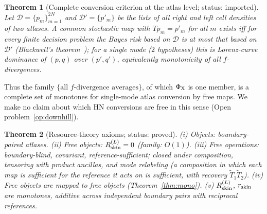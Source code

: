 \documentclass[11pt]{article}
\newtheorem{theorem}{Theorem}
\newcommand{\Rskin}{R_{\rm skin}}
\newcommand{\rskin}{r_{\rm skin}}
\newcommand{\PhiX}{\Phi_{\rm X}}
\begin{document}
\begin{theorem}[Complete conversion criterion at the atlas level; status: imported]\label{thm:blackwell}
Let $\mathcal D=\{p_m\}_{m=1}^{2N}$ and $\mathcal D'=\{p'_m\}$ be the lists of all right and left cell densities of two atlases. A common stochastic map with $Tp_m=p'_m$ for all $m$ exists iff for every finite decision problem the Bayes risk based on $\mathcal D$ is at most that based on $\mathcal D'$ (Blackwell's theorem~\cite{Blackwell}); for a single mode ($2$ hypotheses) this is Lorenz-curve dominance of $(p,q)$ over $(p',q')$, equivalently monotonicity of all $f$-divergences.
\end{theorem}
\noindent Thus the family $\{\text{all }f\text{-divergence averages}\}$, of which $\PhiX$ is one member, is a complete set of monotones for single-mode atlas conversion by free maps. We make no claim about which HN conversions are free in this sense (Open problem~\ref{op:downhill}).

\begin{theorem}[Resource-theory axioms; status: proved]\label{thm:axioms}
(i) Objects: boundary-paired atlases. (ii) Free objects: $\Rskin^{(L)}=0$ (family: $O(1)$). (iii) Free operations: boundary-blind, covariant, reference-sufficient; closed under composition, tensoring with product ancillas, and mode relabeling (a composition in which each map is sufficient for the reference it acts on is sufficient, with recovery $\tilde T_1\tilde T_2$). (iv) Free objects are mapped to free objects (Theorem~\ref{thm:mono}). (v) $\Rskin^{(L)}$, $\rskin$ are monotones, additive across independent boundary pairs with reciprocal references.
\end{theorem}

\end{document}
